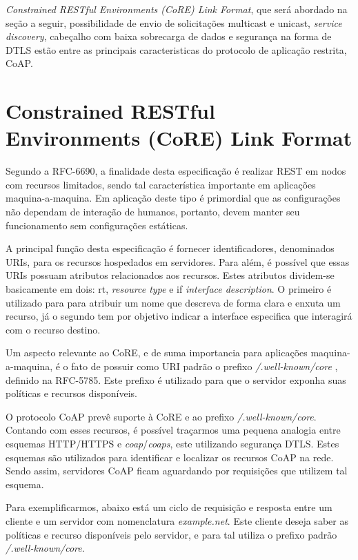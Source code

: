 \textit{Constrained RESTful Environments (CoRE) Link Format}, que será abordado na seção a seguir, possibilidade de envio de solicitações multicast e unicast, \textit{service discovery}, cabeçalho com baixa sobrecarga de dados e segurança na forma de DTLS\cite{rfc6347}
estão entre as principais caracteristicas do protocolo de aplicação restrita, CoAP.

\section{Constrained RESTful Environments (CoRE) Link Format}

Segundo a RFC-6690, a finalidade desta especificação é realizar REST em nodos com recursos limitados, sendo tal característica importante em aplicações maquina-a-maquina\cite{rfc6690}.
Em aplicação deste tipo é primordial que as configurações não dependam de interação de humanos, portanto, devem manter seu funcionamento sem configurações estáticas.


A principal função desta especificação é fornecer identificadores, denominados URIs, para os recursos hospedados em servidores. 
Para além, é possível que essas URIs possuam atributos relacionados aos recursos.
Estes atributos dividem-se basicamente em dois: rt, \textit{resource type} e if \textit{interface description}.
O primeiro é utilizado para para atribuir um nome que descreva de forma clara e enxuta um recurso,
já o segundo tem por objetivo indicar a interface especifica que interagirá com o recurso destino.

Um aspecto relevante ao CoRE, e de suma importancia para aplicações maquina-a-maquina, é o fato de possuir como URI padrão o prefixo \textit{/.well-known/core} , definido na RFC-5785\cite{rfc5785}.
Este prefixo é utilizado para que o servidor exponha suas políticas e recursos disponíveis.

O protocolo CoAP prevê suporte à CoRE e ao prefixo \textit{/.well-known/core}. Contando com esses recursos, é possível traçarmos uma pequena analogia entre
esquemas HTTP/HTTPS e \textit{coap}/\textit{coaps}, este utilizando segurança DTLS.
Estes esquemas são utilizados para identificar e localizar os recursos CoAP na rede.
Sendo assim, servidores CoAP ficam aguardando por requisições que utilizem tal esquema.

Para exemplificarmos, abaixo está um ciclo de requisição e resposta entre um cliente e um servidor com nomenclatura \textit{example.net}.
Este cliente deseja saber as políticas e recurso disponíveis pelo servidor, e para tal utiliza o prefixo padrão \textit{/.well-known/core}.

